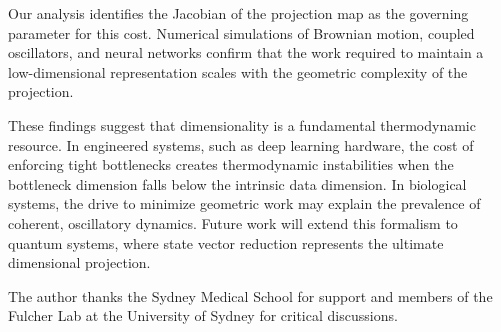 \documentclass[aps,pre,twocolumn,superscriptaddress,floatfix]{revtex4-2}
\begin{document}
Our analysis identifies the Jacobian of the projection map as the governing parameter for this cost. Numerical simulations of Brownian motion, coupled oscillators, and neural networks confirm that the work required to maintain a low-dimensional representation scales with the geometric complexity of the projection.

These findings suggest that dimensionality is a fundamental thermodynamic resource. In engineered systems, such as deep learning hardware, the cost of enforcing tight bottlenecks creates thermodynamic instabilities when the bottleneck dimension falls below the intrinsic data dimension. In biological systems, the drive to minimize geometric work may explain the prevalence of coherent, oscillatory dynamics. Future work will extend this formalism to quantum systems, where state vector reduction represents the ultimate dimensional projection.

\begin{acknowledgments}
The author thanks the Sydney Medical School for support and members of the Fulcher Lab at the University of Sydney for critical discussions.
\end{acknowledgments}


\end{document}
